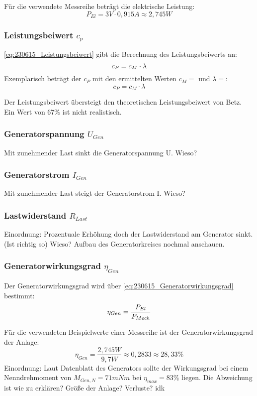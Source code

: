 Für die verwendete Messreihe beträgt die elektrische Leistung:
$$P_{El} = 3V \cdot 0,915A \approx 2,745W$$


\subsubsection*{Leistungsbeiwert $c_p$}
\autoref{eq:230615_Leistungsbeiwert} gibt die Berechnung des Leistungsbeiwerts an:
 \begin{equation}
     \centering
     c_P = c_M \cdot \lambda
     \label{eq:230615_Leistungsbeiwert}
 \end{equation}
Exemplarisch beträgt der $c_P$ mit den ermittelten Werten $c_M = $ und $\lambda =$:
 $$c_P = c_M \cdot \lambda$$

 Der Leistungsbeiwert übersteigt den theoretischen Leistungsbeiwert von Betz. Ein Wert von 67\% ist nicht realistisch.

\subsubsection*{Generatorspannung $U_{Gen}$}
Mit zunehmender Last sinkt die Generatorspannung U. Wieso?
\subsubsection*{Generatorstrom $I_{Gen}$}
Mit zunehmender Last steigt der Generatorstrom I. Wieso?
\subsubsection*{Lastwiderstand $R_{Last}$}
Einordnung: Prozentuale Erhöhung doch der Lastwiderstand am Generator sinkt. (Ist richtig so) Wieso? Aufbau des Generatorkreises nochmal anschauen.
\subsubsection*{Generatorwirkungsgrad $\eta_{Gen}$}
Der Generatorwirkungsgrad wird über \autoref{eq:230615_Generatorwirkungsgrad} bestimmt:
\begin{equation}
    \centering
    \eta_{Gen} = \frac{P_{El}}{P_{Mech}}
    \label{eq:230615_Generatorwirkungsgrad}
\end{equation}

Für die verwendeten Beispielwerte einer Messreihe ist der Generatorwirkungsgrad der Anlage:
$$\eta_{Gen} = \frac{2,745W}{9,7W} \approx 0,2833 \approx 28,33\% $$
Einordnung:
Laut Datenblatt des Generators sollte der Wirkungsgrad bei einem Nenndrehmoment von $M_{Gen,N}= 71 mNm$ bei $\eta_{max}=83\%$ liegen.
Die Abweichung ist wie zu erklären? Größe der Anlage? Verluste? idk
